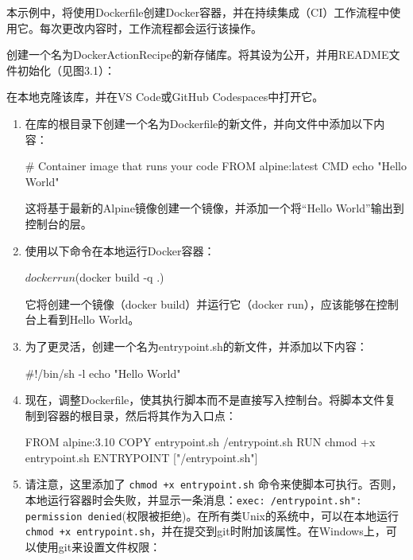 
本示例中，将使用Dockerfile创建Docker容器，并在持续集成（CI）工作流程中使用它。每次更改内容时，工作流程都会运行该操作。


创建一个名为DockerActionRecipe的新存储库。将其设为公开，并用README文件初始化（见图3.1）：


在本地克隆该库，并在VS Code或GitHub Codespaces中打开它。


\begin{enumerate}
\item 
在库的根目录下创建一个名为Dockerfile的新文件，并向文件中添加以下内容：

\begin{shell}
# Container image that runs your code
FROM alpine:latest
CMD echo "Hello World"
\end{shell}

这将基于最新的Alpine镜像创建一个镜像，并添加一个将“Hello World”输出到控制台的层。

\item 
使用以下命令在本地运行Docker容器：

\begin{shell}
$ docker run $(docker build -q .)
\end{shell}

它将创建一个镜像（docker build）并运行它（docker run），应该能够在控制台上看到Hello World。

\item 
为了更灵活，创建一个名为entrypoint.sh的新文件，并添加以下内容：

\begin{shell}
#!/bin/sh -l
echo "Hello World"
\end{shell}

\item 
现在，调整Dockerfile，使其执行脚本而不是直接写入控制台。将脚本文件复制到容器的根目录，然后将其作为入口点：

\begin{shell}
FROM alpine:3.10
COPY entrypoint.sh /entrypoint.sh
RUN chmod +x entrypoint.sh
ENTRYPOINT ["/entrypoint.sh"]
\end{shell}

\item 
请注意，这里添加了 \verb|chmod +x entrypoint.sh| 命令来使脚本可执行。否则，本地运行容器时会失败，并显示一条消息：\verb|exec: /entrypoint.sh": permission denied|(权限被拒绝)。在所有类Unix的系统中，可以在本地运行 \verb|chmod +x entrypoint.sh|，并在提交到git时附加该属性。在Windows上，可以使用git来设置文件权限：


\end{enumerate}
